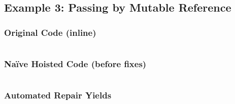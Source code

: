 \subsection{Example 3: Passing by Mutable Reference}
\subsubsection*{Original Code (inline)}
\inputminted{rust}{6_appendices/app1_code/ex3_oc.rs}

\subsubsection*{Na\"ive Hoisted Code (before fixes)}
\inputminted{rust}{6_appendices/app1_code/ex3_nhs.rs}

\subsubsection*{Automated Repair Yields}
\inputminted{rust}{6_appendices/app1_code/ex3_ar.rs}
